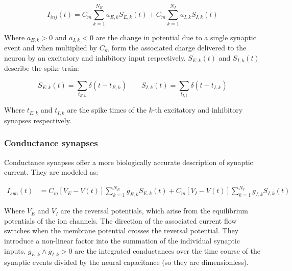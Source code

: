     \begin{equation}
      I_{inj}(t) = C_m\sum\limits_{k=1}^{N_E}a_{E,k}S_{E,k}(t) + C_m\sum\limits_{k=1}^{N_I}a_{I,k}S_{I,k}(t)
    \end{equation}

    Where $a_{E,k}>0$ and $a_{I,k}<0$ are the change in potential due to a single synaptic event and when multiplied by $C_m$ form the associated charge delivered to the neuron by an excitatory and inhibitory input respectively.
    $S_{E,k}(t)$ and $S_{I,k}(t)$ describe the spike train:

    \begin{equation}
      S_{E,k}(t) = \sum\limits_{t_{E,k}}\delta(t-t_{E,k})\qquad S_{I,k}(t) = \sum\limits_{t_{I,k}}\delta(t-t_{I,k})
    \end{equation}

    Where $t_{E,k}$ and $t_{I,k}$ are the spike times of the $k$-th excitatory and inhibitory synapses respectively.

    \subsubsection{Conductance synapses}
    Conductance synapses offer a more biologically accurate description of synaptic current.
    They are modeled as:

    \begin{align}
      I_{syn}(t) &= C_m\left[V_E-V(t)\right]\sum\limits_{k=1}^{N_E}g_{E,k}S_{E,k}(t) + C_m\left[V_I-V(t)\right]\sum\limits_{k=1}^{N_I}g_{I,k}S_{I,k}(t)
    \end{align}

    Where $V_E$ and $V_I$ are the reversal potentials, which arise from the equilibrium potentials of the ion channels.
    The direction of the associated current flow switches when the membrane potential crosses the reversal potential.
    They introduce a non-linear factor into the summation of the individual synaptic inputs.
    $g_{E,k}\land g_{I,k}>0$ are the integrated conductances over the time course of the synaptic events divided by the neural capacitance (so they are dimensionless).

